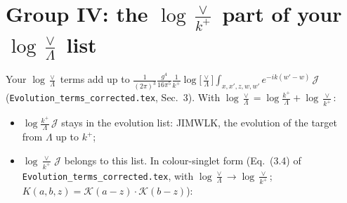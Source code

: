 \documentclass[9pt]{article}
\newcommand{\new}[1]{{\color{blue}#1}}
\numberwithin{equation}{section}
\begin{document}
\section{\new{Group IV: the $\log\frac{\vee}{k^+}$ part of your $\log\frac{\vee}{\Lambda}$ list}}
\new{Your $\log\frac{\vee}{\Lambda}$ terms add up to $\frac{1}{(2\pi)^3}\frac{g^4}{16\pi^5}\frac{1}{k^+}\log\big[\frac{\vee}{\Lambda}\big]\int_{x,x',z,w,w'}e^{-ik(w'-w)}\,\mathcal J$ (\texttt{Evolution\_terms\_corrected.tex}, Sec.~3). With $\log\frac{\vee}{\Lambda}=\log\frac{k^+}{\Lambda}+\log\frac{\vee}{k^+}$:}
\begin{itemize}
\item \new{$\log\frac{k^+}{\Lambda}\,\mathcal J$ stays in the evolution list: JIMWLK, the evolution of the target from $\Lambda$ up to $k^+$;}
\item \new{$\log\frac{\vee}{k^+}\,\mathcal J$ belongs to this list. In colour-singlet form (Eq.~(3.4) of \texttt{Evolution\_terms\_corrected.tex}, with $\log\frac{\vee}{\Lambda}\to\log\frac{\vee}{k^+}$; $K(a,b,z)=\mathcal K(a-z)\cdot\mathcal K(b-z)$):}
\end{itemize}
\end{document}
